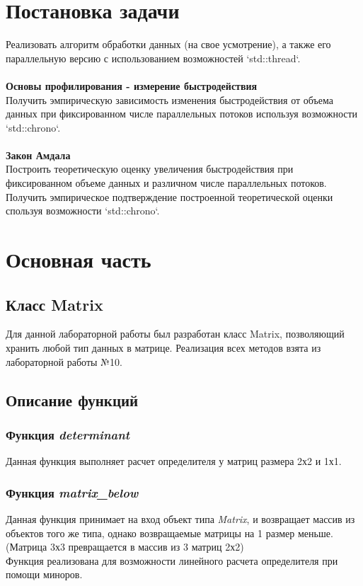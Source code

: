 \documentclass[a4paper, 12pt]{article}
\begin{document}
\cleardoublepage
\section*{Постановка задачи}
Реализовать алгоритм обработки данных (на свое усмотрение), а также его 
параллельную версию с использованием возможностей `std::thread`.
\\\\
\textbf{Основы профилирования - измерение быстродействия} \\
Получить эмпирическую зависимость изменения быстродействия от объема 
данных при фиксированном числе параллельных потоков используя возможности 
`std::chrono`.
\\\\
\textbf{Закон Амдала} \\
Построить теоретическую оценку увеличения быстродействия при фиксированном 
объеме данных и различном числе параллельных потоков.
Получить эмпирическое подтверждение построенной теоретической оценки спользуя 
возможности `std::chrono`.

\cleardoublepage



\section*{Основная часть}

\subsection{Класс Matrix}
Для данной лабораторной работы был разработан класс Matrix, позволяющий хранить
любой тип данных в матрице. Реализация всех методов взята из лабораторной работы
№10.

\subsection{Описание функций}
\subsubsection{Функция \textit{determinant}}
Данная функция выполняет расчет определителя у матриц размера 2х2 и 1х1.

\subsubsection{Функция \textit{matrix\_below}}
Данная функция принимает на вход объект типа \textit{Matrix}, и возвращает
массив из объектов того же типа, однако возвращаемые матрицы на 1 размер меньше.
(Матрица 3х3 превращается в массив из 3 матриц 2х2) \\
Функция реализована для возможности линейного расчета определителя при помощи
миноров.
\end{document}
